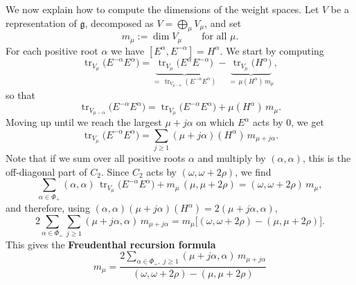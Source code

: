 

We now explain how to compute the dimensions of the weight spaces. Let $V$ be a representation of
$\mathfrak{g}$, decomposed as $V = \bigoplus_\mu V_\mu$, and set
\[
    m_\mu := \dim V_\mu \qquad \text{for all } \mu.
\]
For each positive root $\alpha$ we have $[E^{\alpha}, E^{-\alpha}] = H^{\alpha}$. We start by
computing
\[
    \operatorname{tr}_{V_\mu}\!\big(E^{-\alpha} E^{\alpha}\big)
        = \underbrace{\operatorname{tr}_{V_\mu}\!\big(E^{\alpha} E^{-\alpha}\big)}_{=\,\operatorname{tr}_{V_{\mu-\alpha}}(E^{-\alpha} E^{\alpha})}
        - \underbrace{\operatorname{tr}_{V_\mu}\!\big(H^{\alpha}\big)}_{=\,\mu(H^{\alpha})\, m_\mu},
\]
so that
\[
    \operatorname{tr}_{V_{\mu-\alpha}}\!\big(E^{-\alpha} E^{\alpha}\big)
        = \operatorname{tr}_{V_\mu}\!\big(E^{-\alpha} E^{\alpha}\big) + \mu(H^{\alpha})\, m_\mu.
\]
Moving up until we reach the largest $\mu + j\alpha$ on which $E^{\alpha}$ acts by $0$, we get
\[
    \operatorname{tr}_{V_\mu}\!\big(E^{-\alpha} E^{\alpha}\big)
        = \sum_{j \geq 1} (\mu + j\alpha)(H^{\alpha})\, m_{\mu + j\alpha}.
\]
Note that if we sum over all positive roots $\alpha$ and multiply by $(\alpha, \alpha)$, this is the
off-diagonal part of $C_2$. Since $C_2$ acts by $(\omega, \omega + 2\rho)$, we find
\[
    \sum_{\alpha \in \Phi_+} (\alpha, \alpha)\, \operatorname{tr}_{V_\mu}\!\big(E^{-\alpha} E^{\alpha}\big)
        + m_\mu\, (\mu, \mu + 2\rho) = (\omega, \omega + 2\rho)\, m_\mu,
\]
and therefore, using $(\alpha, \alpha)(\mu + j\alpha)(H^{\alpha}) = 2(\mu + j\alpha, \alpha)$,
\[
    2 \sum_{\alpha \in \Phi_+} \sum_{j \geq 1} (\mu + j\alpha, \alpha)\, m_{\mu + j\alpha}
        = m_\mu\big[(\omega, \omega + 2\rho) - (\mu, \mu + 2\rho)\big].
\]
This gives the \textbf{Freudenthal recursion formula}
\[
    \boxed{\;
    m_\mu = \frac{2 \displaystyle\sum_{\alpha \in \Phi_+,\; j \geq 1} (\mu + j\alpha, \alpha)\, m_{\mu + j\alpha}}
                 {(\omega, \omega + 2\rho) - (\mu, \mu + 2\rho)}
    \;}
\]

